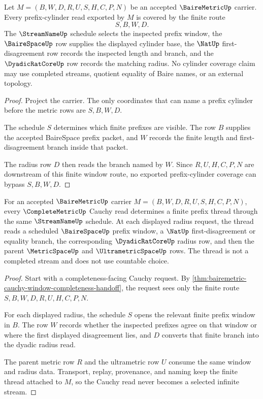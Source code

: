 \begin{theorem}
\label{thm:bairemetric-prefix-cylinder-coverage}
Let $M=(B,W,D,R,U,S,H,C,P,N)$ be an accepted $\BaireMetricUp$ carrier. Every prefix-cylinder read exported by $M$ is covered by the finite route
$$
S,B,W,D .
$$
The $\StreamNameUp$ schedule selects the inspected prefix window, the $\BaireSpaceUp$ row supplies the displayed cylinder base, the $\NatUp$ first-disagreement row records the inspected length and branch, and the $\DyadicRatCoreUp$ row records the matching radius. No cylinder coverage claim may use completed streams, quotient equality of Baire names, or an external topology.
\end{theorem}
\begin{proof}
Project the carrier. The only coordinates that can name a prefix cylinder before the metric rows are $S,B,W,D$.

The schedule $S$ determines which finite prefixes are visible. The row $B$ supplies the accepted BaireSpace prefix packet, and $W$ records the finite length and first-disagreement branch inside that packet.

The radius row $D$ then reads the branch named by $W$. Since $R,U,H,C,P,N$ are downstream of this finite window route, no exported prefix-cylinder coverage can bypass $S,B,W,D$.
\end{proof}

\begin{theorem}
\label{thm:bairemetric-cauchy-prefix-thread}
For an accepted $\BaireMetricUp$ carrier $M=(B,W,D,R,U,S,H,C,P,N)$, every $\CompleteMetricUp$ Cauchy read determines a finite prefix thread through the same $\StreamNameUp$ schedule. At each displayed radius request, the thread reads a scheduled $\BaireSpaceUp$ prefix window, a $\NatUp$ first-disagreement or equality branch, the corresponding $\DyadicRatCoreUp$ radius row, and then the parent $\MetricSpaceUp$ and $\UltrametricSpaceUp$ rows. The thread is not a completed stream and does not use countable choice.
\end{theorem}
\begin{proof}
Start with a completeness-facing Cauchy request. By \autoref{thm:bairemetric-cauchy-window-completeness-handoff}, the request sees only the finite route $S,B,W,D,R,U,H,C,P,N$.

For each displayed radius, the schedule $S$ opens the relevant finite prefix window in $B$. The row $W$ records whether the inspected prefixes agree on that window or where the first displayed disagreement lies, and $D$ converts that finite branch into the dyadic radius read.

The parent metric row $R$ and the ultrametric row $U$ consume the same window and radius data. Transport, replay, provenance, and naming keep the finite thread attached to $M$, so the Cauchy read never becomes a selected infinite stream.
\end{proof}


